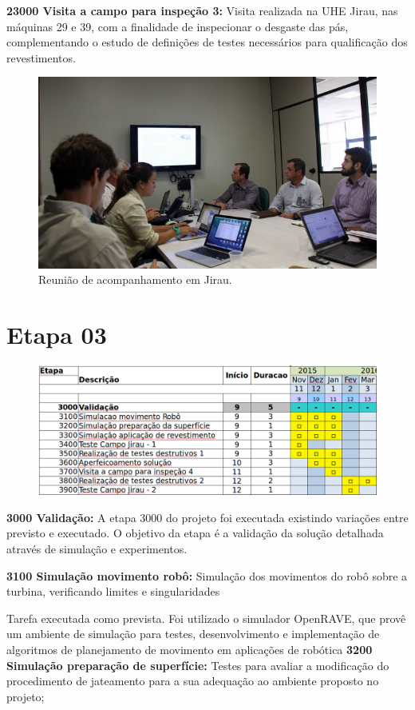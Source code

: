 \noindent
\textbf{23000 Visita a campo para inspeção 3:} Visita realizada na UHE Jirau,
nas máquinas 29 e 39, com a finalidade de inspecionar o desgaste das pás,
complementando o estudo de definições de testes necessários para qualificação
dos revestimentos.

\begin{figure}[h!]
\centering
\label{fig::reuniao}
\includegraphics[width=0.6\columnwidth]{figs/img_4836}
\caption{Reunião de acompanhamento em Jirau.}
\end{figure} 

\section{Etapa 03} 

\begin{figure}[H]
\centering
\includegraphics[width=0.9\columnwidth]{figs/etapa3}
\end{figure} 

\noindent
\textbf{3000 Validação:} A etapa 3000 do projeto foi executada existindo
variações entre previsto e executado. O objetivo da etapa é a validação da
solução detalhada através de simulação e experimentos.

\noindent
\textbf{3100 Simulação movimento robô:} 
Simulação dos movimentos do robô sobre a turbina, verificando limites e singularidades

Tarefa executada como prevista. Foi utilizado o simulador OpenRAVE, que provê
um ambiente de simulação para testes, desenvolvimento e implementação de
algoritmos de planejamento de movimento em aplicações de robótica
\noindent
\textbf{3200 Simulação preparação de superfície:}
Testes para avaliar a modificação do procedimento de jateamento para a sua adequação ao ambiente proposto no projeto;

